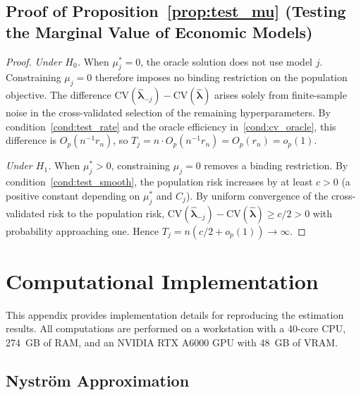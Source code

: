 \subsection{Proof of Proposition~\ref{prop:test_mu} (Testing the Marginal Value of Economic Models)}
\label{app:proof_test_mu}

\begin{proof}
\emph{Under $H_0$.}
When $\mu_j^* = 0$, the oracle solution does not use model $j$.
Constraining $\mu_j = 0$ therefore imposes no binding restriction on the
population objective.
The difference
$\mathrm{CV}(\hat{\boldsymbol{\lambda}}_{-j}) -
\mathrm{CV}(\hat{\boldsymbol{\lambda}})$
arises solely from finite-sample noise in the cross-validated selection
of the remaining hyperparameters.
By condition~\ref{cond:test_rate} and the oracle efficiency
in~\ref{cond:cv_oracle}, this difference is
$O_p(n^{-1} r_n)$, so $T_j = n \cdot O_p(n^{-1} r_n) = O_p(r_n) = o_p(1)$.

\emph{Under $H_1$.}
When $\mu_j^* > 0$, constraining $\mu_j = 0$ removes a binding
restriction.
By condition~\ref{cond:test_smooth},
the population risk increases by at least
$c > 0$ (a positive constant depending on $\mu_j^*$ and $C_j$).
By uniform convergence of the cross-validated risk to the population risk,
$\mathrm{CV}(\hat{\boldsymbol{\lambda}}_{-j}) -
\mathrm{CV}(\hat{\boldsymbol{\lambda}}) \geq c/2 > 0$
with probability approaching one.
Hence $T_j = n(c/2 + o_p(1)) \to \infty$.
\end{proof}


\section{Computational Implementation}
\label{app:computation}

This appendix provides implementation details for reproducing the estimation results.
All computations are performed on a workstation with a 40-core CPU, 274~GB of RAM, and an NVIDIA RTX A6000 GPU with 48~GB of VRAM.

\subsection{Nystr\"{o}m Approximation}
\label{app:nystrom}

